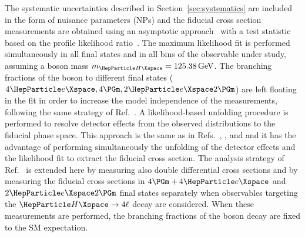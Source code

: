 The systematic uncertainties described in Section~\ref{sec:systematics} are included in the form of nuisance parameters (NPs) and the fiducial cross section measurements are obtained using an asymptotic approach~\cite{LHC-HCG} with a test statistic based on the profile likelihood ratio~\cite{Cowan_2011}.
The maximum likelihood fit is performed simultaneously in all final states and in all bins of the observable under study, assuming a \PH boson mass $\mH=125.38\GeV$.
The branching fractions of the \PH boson to different final states ($4\Pe,4\Pgm,2\Pe2\Pgm$) are left floating in the fit in order to increase the model independence of the measurements, following the same strategy of Ref.~\cite{CMSHIG19001}.
A likelihood-based unfolding procedure is performed to resolve detector effects from the observed distributions to the fiducial phase space. 
This approach is the same as in
Refs.~\cite{Khachatryan:2015yvw}, \cite{CMSHggFiducial8TeV}, and \cite{CMSHIG19001} and it has the advantage of performing simultaneously the unfolding of the detector effects and the likelihood fit to extract the fiducial cross section.
The analysis strategy of Ref.~\cite{CMSHIG19001} is extended here by measuring also double differential cross sections and by measuring the fiducial cross sections in $4\Pgm+4\Pe$ and $2\Pe 2\Pgm$ final states separately when observables targeting the $\Hllll$ decay are considered.
When these measurements are performed, the branching fractions of the \PH boson decay are fixed to the SM expectation.




